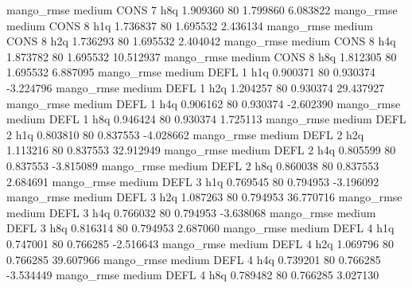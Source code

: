        mango_rmse     medium     CONS                 7                  h8q  1.909360 80       1.799860           6.083822
       mango_rmse     medium     CONS                 8                  h1q  1.736837 80       1.695532           2.436134
       mango_rmse     medium     CONS                 8                  h2q  1.736293 80       1.695532           2.404042
       mango_rmse     medium     CONS                 8                  h4q  1.873782 80       1.695532          10.512937
       mango_rmse     medium     CONS                 8                  h8q  1.812305 80       1.695532           6.887095
       mango_rmse     medium     DEFL                 1                  h1q  0.900371 80       0.930374          -3.224796
       mango_rmse     medium     DEFL                 1                  h2q  1.204257 80       0.930374          29.437927
       mango_rmse     medium     DEFL                 1                  h4q  0.906162 80       0.930374          -2.602390
       mango_rmse     medium     DEFL                 1                  h8q  0.946424 80       0.930374           1.725113
       mango_rmse     medium     DEFL                 2                  h1q  0.803810 80       0.837553          -4.028662
       mango_rmse     medium     DEFL                 2                  h2q  1.113216 80       0.837553          32.912949
       mango_rmse     medium     DEFL                 2                  h4q  0.805599 80       0.837553          -3.815089
       mango_rmse     medium     DEFL                 2                  h8q  0.860038 80       0.837553           2.684691
       mango_rmse     medium     DEFL                 3                  h1q  0.769545 80       0.794953          -3.196092
       mango_rmse     medium     DEFL                 3                  h2q  1.087263 80       0.794953          36.770716
       mango_rmse     medium     DEFL                 3                  h4q  0.766032 80       0.794953          -3.638068
       mango_rmse     medium     DEFL                 3                  h8q  0.816314 80       0.794953           2.687060
       mango_rmse     medium     DEFL                 4                  h1q  0.747001 80       0.766285          -2.516643
       mango_rmse     medium     DEFL                 4                  h2q  1.069796 80       0.766285          39.607966
       mango_rmse     medium     DEFL                 4                  h4q  0.739201 80       0.766285          -3.534449
       mango_rmse     medium     DEFL                 4                  h8q  0.789482 80       0.766285           3.027130
